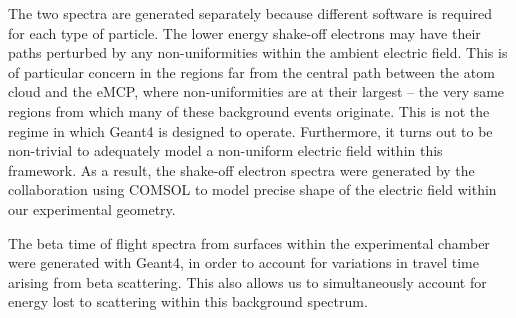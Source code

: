 
The two spectra are generated separately because different software is required for each type of particle.  The lower energy shake-off electrons may have their paths perturbed by any non-uniformities within the ambient electric field.  This is of particular concern in the regions far from the central path between the atom cloud and the eMCP, where non-uniformities are at their largest -- the very same regions from which many of these background events originate.  This is not the regime in which Geant4 is designed to operate. Furthermore, it turns out to be non-trivial to adequately model a non-uniform electric field within this framework.  As a result, the shake-off electron spectra were generated by the collaboration using COMSOL to model precise shape of the electric field within our experimental geometry.  


The beta time of flight spectra from surfaces within the experimental chamber were generated with Geant4, in order to account for variations in travel time arising from beta scattering.  This also allows us to simultaneously account for energy lost to scattering within this background spectrum.






